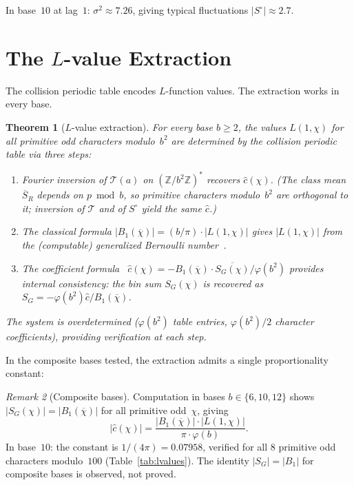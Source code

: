 \documentclass[12pt]{amsart}
\newtheorem{theorem}{Theorem}[section]
\theoremstyle{definition}
\theoremstyle{remark}
\newtheorem{remark}[theorem]{Remark}
\begin{document}
In base~$10$ at lag~$1$: $\sigma^2 \approx 7.26$, giving
typical fluctuations $|S^{\circ}| \approx 2.7$.

\section{The $L$-value Extraction}

The collision periodic table encodes $L$-function values.
The extraction works in every base.

\begin{theorem}[$L$-value extraction]\label{thm:lvalue}
For every base $b \ge 2$, the values $L(1, \chi)$ for all
primitive odd characters modulo~$b^2$ are determined by
the collision periodic table via three steps:
\begin{enumerate}
\item Fourier inversion of $\mathcal{T}(a)$ on
      $(\mathbb{Z}/b^2\mathbb{Z})^{*}$ recovers
      $\widehat{c}(\chi)$. (The class mean
      $\overline{S}_R$ depends on $p \bmod b$, so
      primitive characters modulo~$b^2$ are orthogonal
      to it; inversion of $\mathcal{T}$ and of
      $S^{\circ}$ yield the same $\widehat{c}$.)
\item The classical formula
      $|B_1(\overline{\chi})| = (b / \pi) \cdot
      |L(1, \chi)|$ gives $|L(1, \chi)|$ from
      the (computable) generalized Bernoulli
      number~\cite{davenport}.
\item The coefficient formula~\cite{paperC}
      $\widehat{c}(\chi) = -B_1(\overline{\chi})
      \cdot \overline{S_G(\chi)} / \varphi(b^2)$
      provides internal consistency: the bin sum
      $S_G(\chi)$ is recovered as
      $S_G = -\varphi(b^2) \widehat{c} /
      B_1(\overline{\chi})$.
\end{enumerate}
The system is overdetermined ($\varphi(b^2)$ table entries,
$\varphi(b^2)/2$ character coefficients), providing
verification at each step.
\end{theorem}

In the composite bases tested, the extraction admits a
single proportionality constant:

\begin{remark}[Composite bases]\label{rem:composite}
Computation in bases $b \in \{6, 10, 12\}$ shows
$|S_G(\chi)| = |B_1(\overline{\chi})|$ for all
primitive odd~$\chi$, giving
\[
|\widehat{c}(\chi)| =
\frac{|B_1(\overline{\chi})| \cdot |L(1, \chi)|}
{\pi \cdot \varphi(b)}.
\]
In base~$10$: the constant is $1/(4\pi) = 0.07958$,
verified for all $8$ primitive odd characters
modulo~$100$ (Table~\ref{tab:lvalues}). The identity
$|S_G| = |B_1|$ for composite bases is observed, not
proved.
\end{remark}
\end{document}
